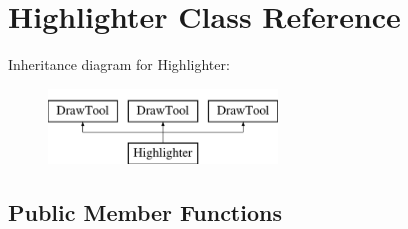 \hypertarget{classHighlighter}{\section{Highlighter Class Reference}
\label{classHighlighter}
}
Inheritance diagram for Highlighter\-:\begin{figure}[H]
\begin{center}
\leavevmode
\includegraphics[height=2.000000cm]{classHighlighter}
\end{center}
\end{figure}
\subsection*{Public Member Functions}
